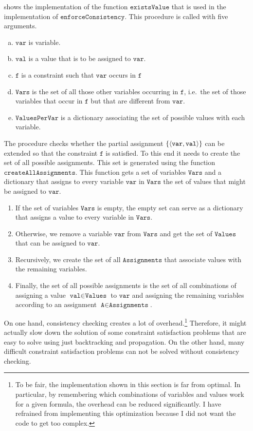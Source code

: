\noindent
{} shows the implementation of the function $\texttt{existsValue}$ that
is used in the implementation of $\texttt{enforceConsistency}$.  This procedure is called with five arguments.
\begin{enumerate}[(a)]
\item $\texttt{var}$ is variable.
\item $\texttt{val}$ is a value that is to be assigned to $\texttt{var}$.
\item $\texttt{f}$ is a constraint such that $\texttt{var}$ occurs in $\texttt{f}$
\item $\texttt{Vars}$ is the set of all those other variables occurring in $\texttt{f}$, i.e.~the set of those
      variables that occur in $\texttt{f}$ but that are different from $\texttt{var}$. 
\item $\texttt{ValuesPerVar}$  is a dictionary associating the set of possible values with each variable.
\end{enumerate}
The procedure checks whether the partial assignment $\{ \pair(\texttt{var}, \texttt{val}) \}$ can be
extended so that the constraint $\texttt{f}$ is satisfied.  To this end it needs to create the set of all
possible assignments.  This set is generated using the function $\texttt{createAllAssignments}$.  This function
gets a set of variables $\texttt{Vars}$ and a dictionary that assigns to every variable $\texttt{var}$ in
$\texttt{Vars}$ the set of values that might be assigned to $\texttt{var}$.
\begin{enumerate}
\item If the set of variables $\texttt{Vars}$ is empty, the empty set can serve as a dictionary that 
      assigns a value to every variable in $\texttt{Vars}$.
\item Otherwise, we remove a variable $\texttt{var}$ from $\texttt{Vars}$ and get the set of $\texttt{Values}$
      that can be assigned to $\texttt{var}$.  
\item Recursively, we create the set of all $\texttt{Assignments}$ that associate values with the remaining 
      variables.
\item Finally, the set of all possible assignments is the set of all combinations of assigning a value 
      $\texttt{val} \in \texttt{Values}$ to $\texttt{var}$ and assigning the remaining variables according to 
      an assignment $\texttt{A} \in \texttt{Assignments}$.
\end{enumerate}
On one hand, consistency checking creates a lot of overhead.\footnote{
  To be fair, the implementation shown in this section is far from optimal.  In particular, by remembering which
  combinations of variables and values work for a given formula, the overhead can be reduced significantly.  I have
  refrained from implementing this optimization because I did not want the code to get too complex.
}
Therefore, it might actually slow down the
solution of some constraint satisfaction problems that are easy to solve using just backtracking and
propagation.  On the other hand, many difficult constraint satisfaction problems can not be solved
without consistency checking.

